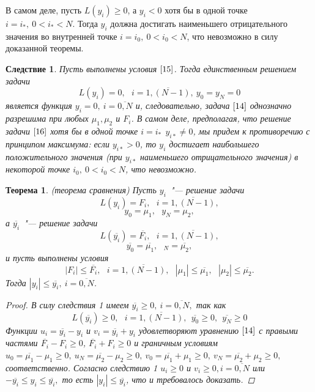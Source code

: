 \documentclass[11pt,a4paper,twoside]{report}
\numberwithin{equation}{section}
\theoremstyle{definition}
\theoremstyle{plain}
\newtheorem{theorem}{Теорема}[section]
\newtheorem{cons}{Следствие}[section]
\begin{document}
В самом деле, пусть $L(y_i) \geqslant 0$,  а $y_i < 0$ хотя бы в одной точке
$i=i_*,~ 0<i_*<N$. Тогда $y_i$ должна достигать наименьшего отрицательного
значения во внутренней точке $i=i_0,~ 0<i_0<N$, что невозможно в силу
доказанной теоремы.
%
\begin{cons}
%
    Пусть выполнены условия $\eqref{15}$. Тогда единственным решением задачи
    \begin{equation}
        \label{16}
        L(y_i)=0,~~~i=\overline{1,(N-1)}, ~y_0=y_N=0
    \end{equation}
    является функция $y_i = 0,~i=\overline{0,N}$ и, следовательно, задача
    $\eqref{14}$ однозначно разрешима при любых $\mu_1, \mu_2$ и $F_i$.
    В самом деле, предполагая, что решение задачи $\eqref{16}$ хотя бы в одной
    точке $i=i_*~~y_{i*} \neq 0$, мы придем к противоречию с принципом максимума:
    если $y_{i*} > 0$, то $y_i$ достигает наибольшего положительного значения
    (при $y_{i*}$ наименьшего отрицательного значения) в некоторой точке
    $i_0,~0<i_0<N$, что невозможно.
%
\end{cons}
%
%
\begin{theorem}
%
    (теорема сравнения) Пусть $y_i$~"--- решение задачи
    $$
        L(y_i) = F_i,~~~i=\overline{1,(N-1)},
    $$
    $$
        y_0 = \mu_1,~~~y_N = \mu_2,
    $$
    а $\overline{y_i}$~"--- решение задачи
    $$
        L(\overline{y_i}) = \overline{F_i},~~~i=\overline{1,(N-1)},
    $$
     $$
        \overline{y_0} = \overline{\mu_1},~~~\overline{_N} = \overline{\mu_2},
    $$
    и пусть выполнены условия
    $$
        |F_i| \leqslant \overline{F_i},~~~i=\overline{1,(N-1)},
        ~~~|\mu_1| \leqslant \overline{\mu_1},~~~|\mu_2| \leqslant \overline{\mu_2}.
    $$
    Тогда $|y_i| \leqslant \overline{y_i},~i=\overline{0,N}$.
    \begin{proof}
        В силу следствия 1 имеем $\overline{y_i} \geqslant 0,~i=\overline{0,N},$ так как
        $$
            L(\overline{y_i}) \geqslant 0,~~~i=\overline{1,(N-1)},
            ~~\overline{y_0} \geqslant 0, ~~\overline{y_N} \geqslant 0
        $$
        Функции $u_i = \overline{y_i} - y_i$ и $v_i = \overline{y_i} + y_i$
        удовлетворяют уравнению $\eqref{14}$ с правыми частями
        $\overline{F_i}-F_i \geqslant 0$, $\overline{F_i}+F_i \geqslant 0$
        и граничным условиям
        $u_0 = \overline{\mu_1} - \mu_1 \geqslant 0,
        ~u_N = \overline{\mu_2} - \mu_2 \geqslant 0,
        ~v_0 = \overline{\mu_1} + \mu_1 \geqslant 0,
        ~v_N = \overline{\mu_2} + \mu_2 \geqslant 0,$ соответственно.
        Согласно следствию 1 $u_i \geqslant 0$ и $v_i \geqslant 0, i=\overline{0,N}$
        или $-\overline{y_i}\leqslant y_i \leqslant \overline{y_i},$
        то есть $|y_i| \leqslant \overline{y_i}$, что и требовалось доказать.
    \end{proof}
%
\end{theorem}
%
\end{document}
